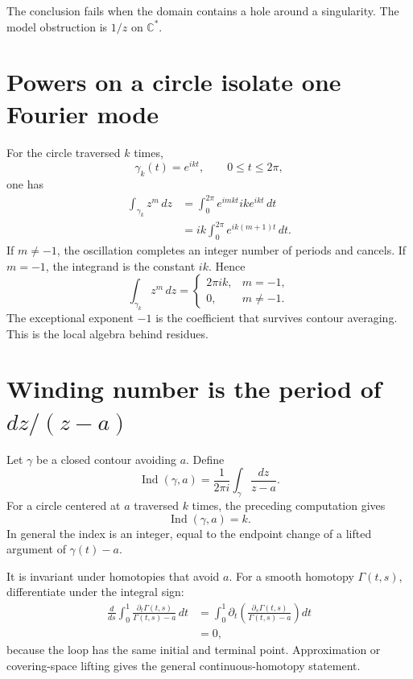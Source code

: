 The conclusion fails when the domain contains a hole around a singularity.  The model obstruction is \(1/z\) on \(\mathbb C^*\).

\section{Powers on a circle isolate one Fourier mode}

For the circle traversed \(k\) times,
\[
  \gamma_k(t)=e^{ikt},
  \qquad
  0\le t\le2\pi,
\]
one has
\[
\begin{aligned}
  \int_{\gamma_k}z^m\,dz
  &=\int_0^{2\pi}
  e^{imkt}ik e^{ikt}\,dt\\
  &=ik\int_0^{2\pi}e^{ik(m+1)t}\,dt.
\end{aligned}
\]
If \(m\ne-1\), the oscillation completes an integer number of periods and cancels.  If \(m=-1\), the integrand is the constant \(ik\).  Hence
\[
  \boxed{
  \int_{\gamma_k}z^m\,dz
  =
  \begin{cases}
  2\pi i k,&m=-1,\\
  0,&m\ne-1.
  \end{cases}}
\]
The exceptional exponent \(-1\) is the coefficient that survives contour averaging.  This is the local algebra behind residues.

\section{Winding number is the period of \texorpdfstring{$dz/(z-a)$}{dz/(z-a)}}

Let \(\gamma\) be a closed contour avoiding \(a\).  Define
\[
  \operatorname{Ind}(\gamma,a)
  =\frac{1}{2\pi i}
  \int_\gamma\frac{dz}{z-a}.
\]
For a circle centered at \(a\) traversed \(k\) times, the preceding computation gives
\[
  \operatorname{Ind}(\gamma,a)=k.
\]
In general the index is an integer, equal to the endpoint change of a lifted argument of \(\gamma(t)-a\).

It is invariant under homotopies that avoid \(a\).  For a smooth homotopy \(\Gamma(t,s)\), differentiate under the integral sign:
\[
\begin{aligned}
  \frac{d}{ds}
  \int_0^1
  \frac{\partial_t\Gamma(t,s)}{\Gamma(t,s)-a}\,dt
  &=\int_0^1
  \partial_t
  \left(
  \frac{\partial_s\Gamma(t,s)}{\Gamma(t,s)-a}
  \right)dt\\
  &=0,
\end{aligned}
\]
because the loop has the same initial and terminal point.  Approximation or covering-space lifting gives the general continuous-homotopy statement.

